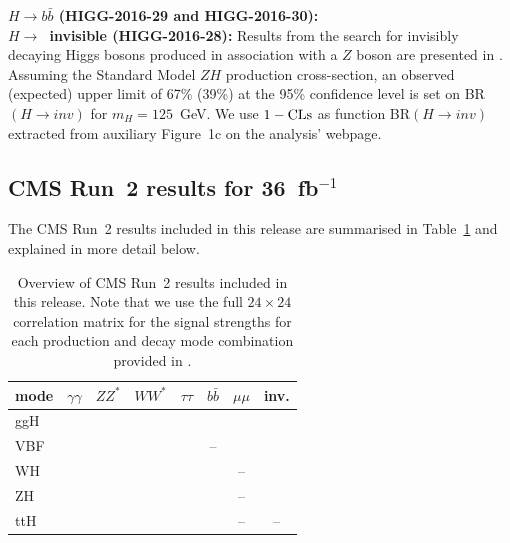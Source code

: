 {\bf\boldmath $H\to b\bar b$ (HIGG-2016-29 and HIGG-2016-30):}\\



{\bf\boldmath $H\to$~invisible (HIGG-2016-28):}
Results from the search for invisibly decaying Higgs bosons produced in association with a $Z$ boson are presented in \cite{Aaboud:2017bja}. Assuming the Standard Model $ZH$ production cross-section, an observed (expected) upper limit of 67\% (39\%) at the 95\% confidence level is set on BR$(H\to inv)$ for $m_H= 125$~GeV. We use $1-{\rm CLs}$ as function BR$(H\to inv)$ extracted from auxiliary Figure~1c on the analysis' webpage. 


\clearpage
\subsection{CMS Run~2 results for 36~fb$^{-1}$}

The CMS Run~2 results included in this release are summarised in Table~\ref{tab:CMSresults} and explained in more detail below.

\begin{table}[h]\centering
\begin{tabular}{l | ccccccc}
mode & $\gamma\gamma$ & $ZZ^*$ & $WW^*$ & $\tau\tau$ & $b\bar b$ & $\mu\mu$ & inv. \\
\hline
ggH & \cite{Sirunyan:2018koj} & \cite{Sirunyan:2018koj} & \cite{Sirunyan:2018koj} & \cite{Sirunyan:2018koj} & \cite{Sirunyan:2018koj} & \cite{Sirunyan:2018koj} & \cite{Sirunyan:2018owy} \\
VBF &  \cite{Sirunyan:2018koj} & \cite{Sirunyan:2018koj} & \cite{Sirunyan:2018koj} & \cite{Sirunyan:2018koj} &-- & \cite{Sirunyan:2018koj} & \cite{Sirunyan:2018owy} \\
WH &  \cite{Sirunyan:2018koj} & \cite{Sirunyan:2018koj} & \cite{Sirunyan:2018koj} & \cite{Sirunyan:2018cpi} & \cite{Sirunyan:2018koj} & -- & \cite{Sirunyan:2018owy} \\
ZH & \cite{Sirunyan:2018koj} & \cite{Sirunyan:2018koj} & \cite{Sirunyan:2018koj} & \cite{Sirunyan:2018cpi} & \cite{Sirunyan:2018koj} & -- & \cite{Sirunyan:2018owy} \\
ttH & \cite{Sirunyan:2018koj} & \cite{Sirunyan:2018koj} & \cite{Sirunyan:2018koj} & \cite{Sirunyan:2018koj} & \cite{Sirunyan:2018koj} & -- & -- \\
\end{tabular}
\caption{Overview of CMS Run~2 results included in this release. Note that we use the full $24\times 24$ correlation matrix 
for the signal strengths for each production and decay mode combination provided in \cite{Sirunyan:2018koj}.}
\label{tab:CMSresults}
\end{table}


